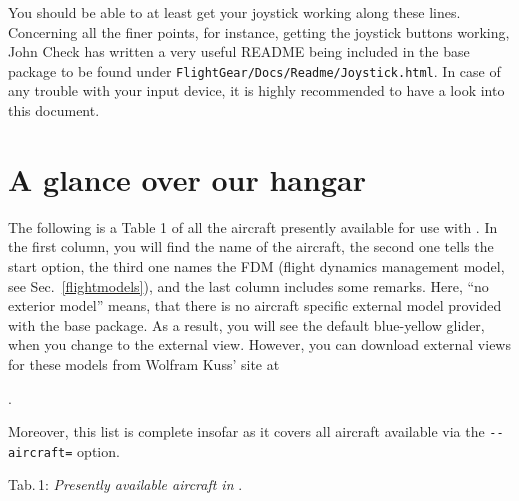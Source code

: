 You should be able to at least get your joystick working along
these lines. Concerning all the finer points, for instance, getting the joystick buttons
working, John Check has written a very useful README being included in the base package to be found under \texttt{FlightGear/Docs/Readme/Joystick.html}. In case of any trouble with your input device, it is highly recommended to have a look into this document.

\section{A glance over our hangar}\label{hangar}
The following is a Table 1 of all the aircraft presently available for use with \FlightGear{}. In the first column, you will find the name of the aircraft, the second one tells the start option, the third one names the FDM (flight dynamics management model, see Sec.~\ref{flightmodels}), and the last column includes some remarks. Here, ``no exterior model'' means, that there is no aircraft specific external model provided with the base package. As a result, you will see the default blue-yellow glider, when you change to the external view. However, you can download external views for these models from Wolfram Kuss' site at

.

Moreover, this list is complete insofar as it covers all aircraft available via the \texttt{-$ $-aircraft=} option. 
\eject

\noindent
 Tab.\,1: \textit{Presently available aircraft in \FlightGear{}}.
 \medskip
 
\noindent
{\scriptsize

}

